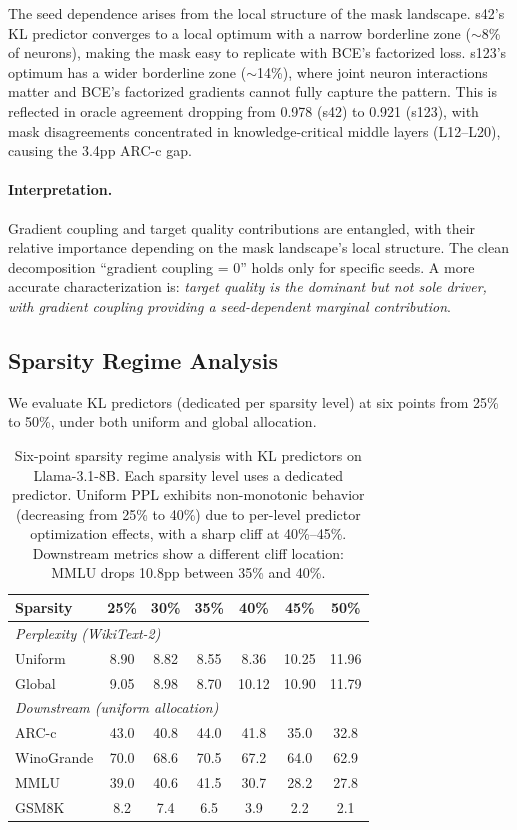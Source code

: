 \documentclass[11pt,a4paper]{article}
\begin{document}
The seed dependence arises from the local structure of the mask landscape. s42's KL predictor converges to a local optimum with a narrow borderline zone ($\sim$8\% of neurons), making the mask easy to replicate with BCE's factorized loss. s123's optimum has a wider borderline zone ($\sim$14\%), where joint neuron interactions matter and BCE's factorized gradients cannot fully capture the pattern. This is reflected in oracle agreement dropping from 0.978 (s42) to 0.921 (s123), with mask disagreements concentrated in knowledge-critical middle layers (L12--L20), causing the 3.4pp ARC-c gap.

\paragraph{Interpretation.} Gradient coupling and target quality contributions are entangled, with their relative importance depending on the mask landscape's local structure. The clean decomposition ``gradient coupling = 0'' holds only for specific seeds. A more accurate characterization is: \emph{target quality is the dominant but not sole driver, with gradient coupling providing a seed-dependent marginal contribution}.

\subsection{Sparsity Regime Analysis}
\label{sec:regime}

We evaluate KL predictors (dedicated per sparsity level) at six points from 25\% to 50\%, under both uniform and global allocation.

\begin{table}[h]
\centering
\small
\begin{tabular}{lcccccc}
\toprule
Sparsity & 25\% & 30\% & 35\% & 40\% & 45\% & 50\% \\
\midrule
\multicolumn{7}{l}{\emph{Perplexity (WikiText-2)}} \\
\quad Uniform & 8.90 & 8.82 & 8.55 & 8.36 & 10.25 & 11.96 \\
\quad Global & 9.05 & 8.98 & 8.70 & 10.12 & 10.90 & 11.79 \\
\midrule
\multicolumn{7}{l}{\emph{Downstream (uniform allocation)}} \\
\quad ARC-c & 43.0 & 40.8 & 44.0 & 41.8 & 35.0 & 32.8 \\
\quad WinoGrande & 70.0 & 68.6 & 70.5 & 67.2 & 64.0 & 62.9 \\
\quad MMLU & 39.0 & 40.6 & 41.5 & 30.7 & 28.2 & 27.8 \\
\quad GSM8K & 8.2 & 7.4 & 6.5 & 3.9 & 2.2 & 2.1 \\
\bottomrule
\end{tabular}
\caption{Six-point sparsity regime analysis with KL predictors on Llama-3.1-8B. Each sparsity level uses a dedicated predictor. Uniform PPL exhibits non-monotonic behavior (decreasing from 25\% to 40\%) due to per-level predictor optimization effects, with a sharp cliff at 40\%--45\%. Downstream metrics show a different cliff location: MMLU drops 10.8pp between 35\% and 40\%.}
\label{tab:regime}
\end{table}
\end{document}
